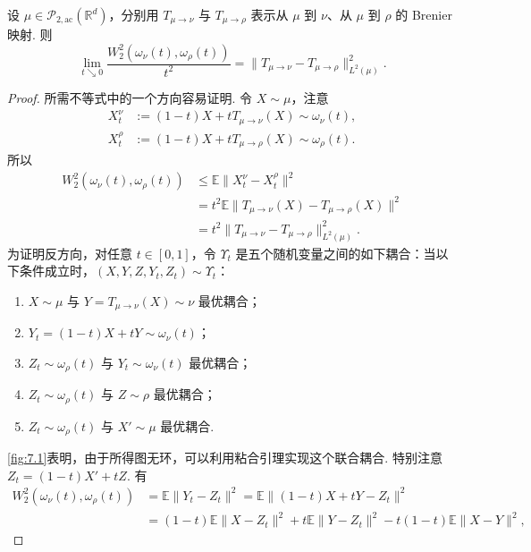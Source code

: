 \begin{lemma}\label{lem:7.22}
设 $\mu\in\mathcal P_{2,\mathrm{ac}}(\mathbb R^d)$，分别用 $T_{\mu\to\nu}$ 与 $T_{\mu\to\rho}$ 表示从 $\mu$ 到 $\nu$、从 $\mu$ 到 $\rho$ 的 Brenier 映射. 则
$$\lim_{t\searrow0}\frac{W_2^2(\omega_\nu(t),\omega_\rho(t))}{t^2}
=\lVert T_{\mu\to\nu}-T_{\mu\to\rho}\rVert_{L^2(\mu)}^2.$$
\end{lemma}
\begin{proof}
所需不等式中的一个方向容易证明. 令 $X\sim\mu$，注意
$$\begin{aligned}
X_t^\nu&:=(1-t)X+tT_{\mu\to\nu}(X)\sim\omega_\nu(t),\\
X_t^\rho&:=(1-t)X+tT_{\mu\to\rho}(X)\sim\omega_\rho(t).
\end{aligned}$$
所以
\begin{equation}\label{eq:7.15}
\begin{aligned}
W_2^2(\omega_\nu(t),\omega_\rho(t))&\le\mathbb E\lVert X_t^\nu-X_t^\rho\rVert^2\\
&=t^2\mathbb E\lVert T_{\mu\to\nu}(X)-T_{\mu\to\rho}(X)\rVert^2\\
&=t^2\lVert T_{\mu\to\nu}-T_{\mu\to\rho}\rVert_{L^2(\mu)}^2.
\end{aligned}
\end{equation}
为证明反方向，对任意 $t\in[0,1]$，令 $\Upsilon_t$ 是五个随机变量之间的如下耦合：当以下条件成立时，$(X,Y,Z,Y_t,Z_t)\sim\Upsilon_t$：
\begin{enumerate}
\item $X\sim\mu$ 与 $Y=T_{\mu\to\nu}(X)\sim\nu$ 最优耦合；
\item $Y_t=(1-t)X+tY\sim\omega_\nu(t)$；
\item $Z_t\sim\omega_\rho(t)$ 与 $Y_t\sim\omega_\nu(t)$ 最优耦合；
\item $Z_t\sim\omega_\rho(t)$ 与 $Z\sim\rho$ 最优耦合；
\item $Z_t\sim\omega_\rho(t)$ 与 $X'\sim\mu$ 最优耦合.
\end{enumerate}
\autoref{fig:7.1}表明，由于所得图无环，可以利用粘合引理实现这个联合耦合. 特别注意 $Z_t=(1-t)X'+tZ$. 有
\begin{equation}\label{eq:7.16}
\begin{aligned}
W_2^2(\omega_\nu(t),\omega_\rho(t))
&=\mathbb E\lVert Y_t-Z_t\rVert^2=\mathbb E\lVert(1-t)X+tY-Z_t\rVert^2\\
&=(1-t)\mathbb E\lVert X-Z_t\rVert^2+t\mathbb E\lVert Y-Z_t\rVert^2
-t(1-t)\mathbb E\lVert X-Y\rVert^2,
\end{aligned}
\end{equation}

\end{proof}
